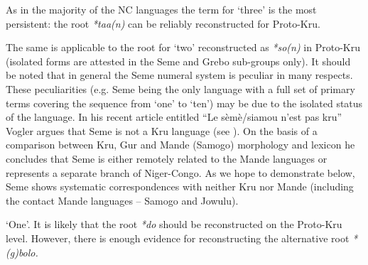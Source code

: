 \addtocounter{footnote}{-3}
As in the majority of the NC languages the term for ‘three’ is the most persistent: the root \textit{*taa(n)} can be reliably reconstructed for Proto-Kru. 

The same is applicable to the root for ‘two’ reconstructed as \textit{*so(n)} in Proto-Kru (isolated forms are attested in the Seme and Grebo sub-groups only). It should be noted that in general the Seme numeral system is peculiar in many respects. These peculiarities (e.g. Seme being the only language with a full set of primary terms covering the sequence from ‘one’ to ‘ten’) may be due to the isolated status of the language. In his recent article entitled “Le sèmè/siamou n’est pas kru” Vogler argues that Seme is not a Kru language (see \citealt{Vogler2015}). On the basis of a comparison between Kru, Gur and Mande (Samogo) morphology and lexicon he concludes that Seme is either remotely related to the Mande languages or represents a separate branch of Niger-Congo. As we hope to demonstrate below, Seme shows systematic correspondences with neither Kru nor Mande (including the contact Mande languages – Samogo and Jowulu).

‘One’. It is likely that the root \textit{*do} should be reconstructed on the Proto-Kru level. However, there is enough evidence for reconstructing the alternative root \textit{*(g)bolo.}

 
